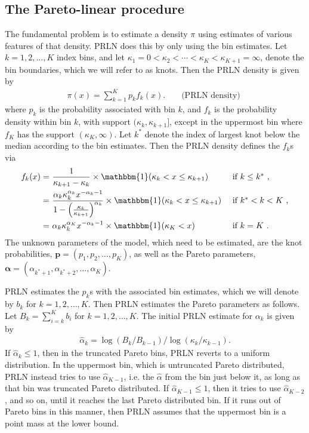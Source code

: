 \documentclass[12pt]{article}
\begin{document}
\subsection{The Pareto-linear procedure}\label{sec:PRLN}
The fundamental problem is to estimate a density $\pi$ using estimates of various features of that density. PRLN does this by only using the bin estimates. Let $k=1,2,\dots,K$ index bins, and let $\kappa_1 = 0 < \kappa_2 < \cdots < \kappa_K < \kappa_{K+1} = \infty$, denote the bin boundaries, which we will refer to as knots. Then the PRLN density is given by
\begin{align}
\pi(x) = \sum_{k=1}^Kp_kf_k(x). && \mbox{ (PRLN density) } \label{eq:density.model}
\end{align}
where $p_k$ is the probability associated with bin $k$, and $f_k$ is the probability density within bin $k$, with support $(\kappa_k, \kappa_{k+1}]$, except in the uppermost bin where $f_K$ has the support $(\kappa_K, \infty)$. Let $k^*$ denote the index of largest knot below the median according to the bin estimates. Then the PRLN density defines the $f_k$s via
\begin{align}
  f_k(x) = &\  \frac{1}{\kappa_{k+1} - \kappa_k} \times \mathbbm{1}(\kappa_k < x \leq \kappa_{k+1}) && \mbox{ if $k \leq k^*$ },\nonumber\\
  = &\  \frac{\alpha_k\kappa_k^{\alpha_k}x^{-\alpha_k - 1}}{1 - \left(\frac{\kappa_k}{\kappa_{k+1}}\right)^{\alpha_k}} \times \mathbbm{1}(\kappa_k < x \leq \kappa_{k+1}) && \mbox{ if $k^* < k < K$ },\nonumber\\
  = &\  \alpha_k\kappa_k^{\alpha_K}x^{-\alpha_k - 1} \times \mathbbm{1}(\kappa_K < x) && \mbox{ if $k = K$ }\label{eq:prln.density}.
\end{align}
The unknown parameters of the model, which need to be estimated, are the knot probabilities, $\bm{p} = (p_1, p_2, \dots, p_K)$, as well as the Pareto parameters, $\bm{\alpha} = (\alpha_{k^* + 1}, \alpha_{k^* + 2}, \dots, \alpha_{K})$.

PRLN estimates the $p_k$s with the associated bin estimates, which we will denote by $b_k$ for $k=1,2,\dots,K$. Then PRLN estimates the Pareto parameters as follows. Let $B_k = \sum_{i=k}^Kb_i$ for $k=1,2,\dots,K$. The initial PRLN estimate for $\alpha_k$ is given by
\begin{align*}
\widehat{\alpha}_k = \log(B_k/B_{k-1}) / \log(\kappa_k / \kappa_{k-1}).
\end{align*}
If $\widehat{\alpha}_k \leq 1$, then in the truncated Pareto bins, PRLN reverts to a uniform distribution. In the uppermost bin, which is untruncated Pareto distributed, PRLN instead tries to use $\widehat{\alpha}_{K-1}$, i.e. the $\widehat{\alpha}$ from the bin just below it, as long as that bin was truncated Pareto distributed. If $\widehat{\alpha}_{K-1} \leq 1$, then it tries to use $\widehat{\alpha}_{K-2}$, and so on, until it reaches the last Pareto distributed bin. If it runs out of Pareto bins in this manner, then PRLN assumes that the uppermost bin is a point mass at the lower bound.
\end{document}
